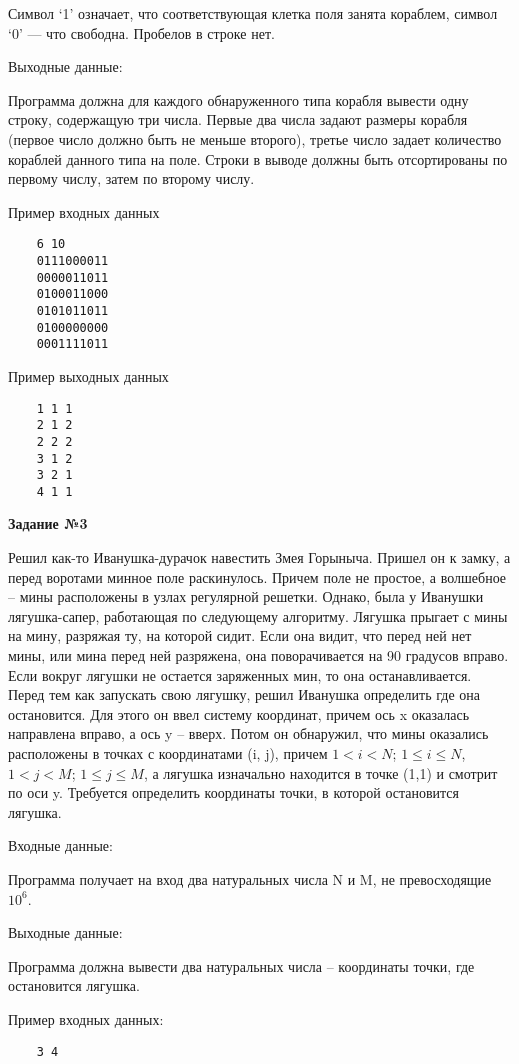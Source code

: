Символ `1' означает, что соответствующая клетка поля занята кораблем, символ `0' — что свободна. Пробелов в строке нет.

Выходные данные:

Программа должна для каждого обнаруженного типа корабля вывести одну строку, содержащую три числа. Первые два числа задают размеры корабля (первое число должно быть не меньше второго), 
третье число задает количество кораблей данного типа на поле. Строки в выводе должны быть отсортированы по первому числу, затем по второму числу.

Пример входных данных
\begin{verbatim}
    6 10
    0111000011
    0000011011
    0100011000
    0101011011
    0100000000
    0001111011
\end{verbatim}

Пример выходных данных
\begin{verbatim}
    1 1 1
    2 1 2
    2 2 2
    3 1 2
    3 2 1
    4 1 1
\end{verbatim}

{\bf Задание №3}

Решил как-то Иванушка-дурачок навестить Змея Горыныча. Пришел он к замку, а перед воротами минное поле раскинулось. Причем поле не простое, а волшебное – мины расположены в узлах регулярной решетки. 
Однако, была у Иванушки лягушка-сапер, работающая по следующему алгоритму. Лягушка прыгает с мины на мину, разряжая ту, на которой сидит. Если она видит, что перед ней нет мины, или мина перед ней разряжена, 
она поворачивается на 90 градусов вправо. Если вокруг лягушки не остается заряженных мин, то она останавливается. Перед тем как запускать свою лягушку, решил Иванушка определить где она остановится. 
Для этого он ввел систему координат, причем ось x оказалась направлена вправо, а ось y – вверх. Потом он обнаружил, что мины оказались расположены в точках с координатами (i, j), причем $1 < i < N$; $1 \le i \le N$, $1 < j < M$; $1 \le j \le M$, 
а лягушка изначально находится в точке (1,1) и смотрит по оси y. Требуется определить координаты точки, в которой остановится лягушка.

Входные данные:

Программа получает на вход два натуральных числа N и M, не превосходящие $10^6$.

Выходные данные:

Программа должна вывести два натуральных числа – координаты точки, где остановится лягушка.

Пример входных данных:
\begin{verbatim}
    3 4
\end{verbatim}

